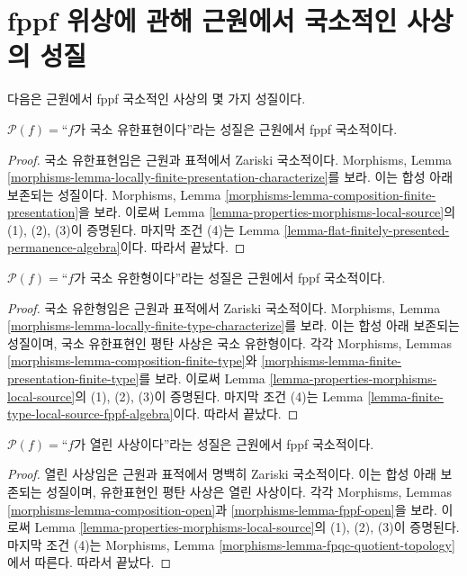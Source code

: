 \section{fppf 위상에 관해 근원에서 국소적인 사상의 성질}
\label{section-fppf-local-source}

\noindent
다음은 근원에서 fppf 국소적인 사상의 몇 가지 성질이다.

\begin{lemma}
\label{lemma-locally-finite-presentation-fppf-local-source}
$\mathcal{P}(f)=$``$f$가 국소 유한표현이다''라는 성질은
근원에서 fppf 국소적이다.
\end{lemma}

\begin{proof}
국소 유한표현임은 근원과 표적에서 Zariski 국소적이다. Morphisms,
Lemma \ref{morphisms-lemma-locally-finite-presentation-characterize}를
보라. 이는 합성 아래 보존되는 성질이다. Morphisms, Lemma
\ref{morphisms-lemma-composition-finite-presentation}을 보라.
이로써 Lemma \ref{lemma-properties-morphisms-local-source}의
(1), (2), (3)이 증명된다. 마지막 조건 (4)는 Lemma
\ref{lemma-flat-finitely-presented-permanence-algebra}이다. 따라서 끝났다.
\end{proof}

\begin{lemma}
\label{lemma-locally-finite-type-fppf-local-source}
$\mathcal{P}(f)=$``$f$가 국소 유한형이다''라는 성질은
근원에서 fppf 국소적이다.
\end{lemma}

\begin{proof}
국소 유한형임은 근원과 표적에서 Zariski 국소적이다. Morphisms,
Lemma \ref{morphisms-lemma-locally-finite-type-characterize}를 보라.
이는 합성 아래 보존되는 성질이며, 국소 유한표현인 평탄 사상은
국소 유한형이다. 각각 Morphisms, Lemmas
\ref{morphisms-lemma-composition-finite-type}와
\ref{morphisms-lemma-finite-presentation-finite-type}를 보라.
이로써 Lemma \ref{lemma-properties-morphisms-local-source}의
(1), (2), (3)이 증명된다. 마지막 조건 (4)는 Lemma
\ref{lemma-finite-type-local-source-fppf-algebra}이다. 따라서 끝났다.
\end{proof}

\begin{lemma}
\label{lemma-open-fppf-local-source}
$\mathcal{P}(f)=$``$f$가 열린 사상이다''라는 성질은
근원에서 fppf 국소적이다.
\end{lemma}

\begin{proof}
열린 사상임은 근원과 표적에서 명백히 Zariski 국소적이다.
이는 합성 아래 보존되는 성질이며, 유한표현인 평탄 사상은 열린
사상이다. 각각 Morphisms, Lemmas
\ref{morphisms-lemma-composition-open}과
\ref{morphisms-lemma-fppf-open}을 보라.
이로써 Lemma \ref{lemma-properties-morphisms-local-source}의
(1), (2), (3)이 증명된다. 마지막 조건 (4)는 Morphisms, Lemma
\ref{morphisms-lemma-fpqc-quotient-topology}에서 따른다. 따라서 끝났다.
\end{proof}

